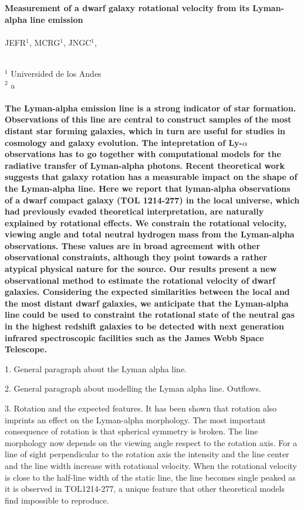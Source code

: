 \documentclass[a4paper, 12pt]{article}
\newcommand{\tol}{TOL1214-277}
\begin{document}
\pagestyle{empty}
\noindent
\textbf{Measurement of a dwarf galaxy rotational velocity from its
  Lyman-alpha line emission} 
\\
\\
JEFR$^{1}$, MCRG$^1$, JNGC$^1$,
\\
\\
\scriptsize
{$^1$ Universided de los Andes
\\
$^2$ a
\normalsize
\\
\\
\textbf{The Lyman-alpha emission line is a strong indicator of star formation.
Observations of this line are central to construct samples of the most
distant star forming galaxies, which in turn are useful for studies in
cosmology and galaxy evolution.  
The intepretation of Ly-$\alpha$ observations has to go together with
computational models for the radiative transfer of Lyman-alpha photons.
Recent theoretical work suggests that galaxy rotation has a
measurable impact on the shape of the Lyman-alpha line. 
Here we report that lyman-alpha observations of a dwarf compact galaxy (TOL
1214-277) in the local universe, which had previously evaded theoretical 
interpretation, are naturally explained by rotational effects.
We constrain the rotational velocity, viewing angle and total
neutral hydrogen mass from the Lyman-alpha observations.
These values are in broad agreement with other observational
constraints, although  they point towards a rather atypical physical
nature for the source.  
Our results present a new observational method to estimate the rotational
velocity of dwarf galaxies.
Considering the expected similarities between the local and the most
distant dwarf galaxies, we anticipate that the Lyman-alpha line could be
used to constraint the rotational state of the neutral gas in the
highest redshift galaxies to be detected with next generation infrared
spectroscopic facilities such as the James Webb Space Telescope.}




1. General paragraph about the Lyman alpha line.

2. General paragraph about modelling the Lyman alpha
line. Outflows.

3. Rotation and the expected features.
It has been shown that rotation also imprints an effect on the
Lyman-alpha morphology. 
The most important consequence of rotation is that spherical 
symmetry is broken.
The line morphology now depends on the viewing angle respect to the
rotation axis.  
For a line of sight perpendicular to the rotation axis the intensity and
the line center and the line width increase with rotational velocity. 
When the rotational velocity is close to the half-line width of the
static line, the line becomes single peaked as it is observed in
\tol, a unique feature that other theoretical models find
impossible to reproduce.



}
\end{document}
